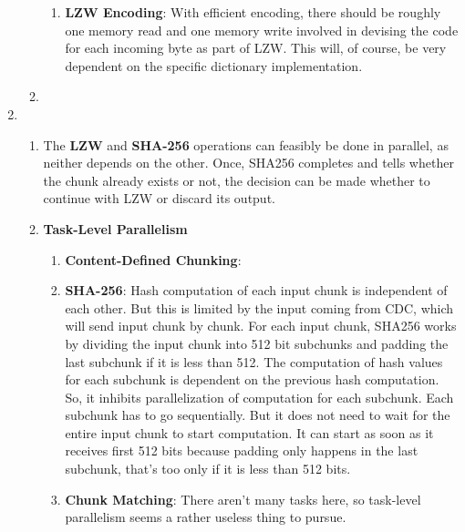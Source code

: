 \documentclass{article}
\begin{document}
\begin{enumerate}
\begin{enumerate}[label=(\alph*)]
\begin{enumerate}[label=(\roman*)]
\item%
\textbf{LZW Encoding}:\newline
With efficient encoding, there should be roughly one memory read and one memory write involved in devising the code for each incoming byte as part of LZW. This will, of course, be very dependent on the specific dictionary implementation.

\end{enumerate}%

\item%

\end{enumerate}%

\item%
\begin{enumerate}[label=(\alph*)]
\item%
The \textbf{LZW} and \textbf{SHA-256} operations can feasibly be done in parallel, as neither depends on the other. 
Once, SHA256 completes and tells whether the chunk already exists or not, the decision can be made whether to continue with LZW or discard its output.  
\item%
\textbf{Task-Level Parallelism}
\begin{enumerate}[label=(\roman*)]
\item%
\textbf{Content-Defined Chunking}:\newline

\item%
\textbf{SHA-256}:\newline
Hash computation of each input chunk is independent of each other. But this is limited by the input coming from CDC, which will send input chunk by chunk.
For each input chunk, SHA256 works by dividing the input chunk into 512 bit subchunks and padding the last subchunk if it is less than 512. The computation of hash values for each subchunk 
is dependent on the previous hash computation. So, it inhibits parallelization of computation for each subchunk. Each subchunk has to go sequentially. But it does not need to wait for 
the entire input chunk to start computation. It can start as soon as it receives first 512 bits because padding only happens in the last subchunk, that's too only if it is less than 512 bits. 

\item%
\textbf{Chunk Matching}:\newline
There aren't many tasks here, so task-level parallelism seems a rather useless thing to pursue.


\end{enumerate}
\end{enumerate}
\end{enumerate}
\end{document}
